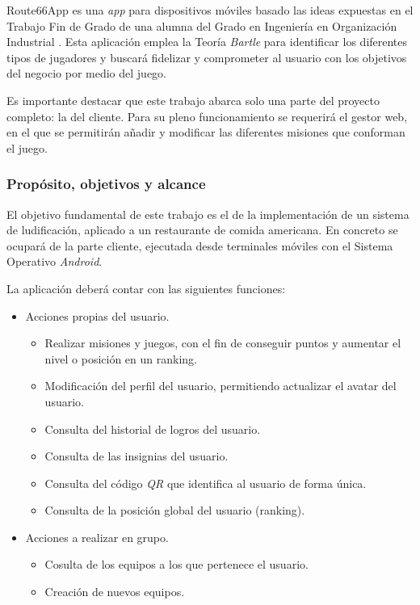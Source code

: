 \documentclass[twoside]{report}
\begin{document}
Route66App es una \textit{app} para dispositivos móviles basado las ideas expuestas en el Trabajo Fin de Grado de una alumna del Grado en Ingeniería en Organización Industrial \cite{cristinatfg}. Esta aplicación emplea la Teoría \textit{Bartle}\cite{iebsctj} para identificar los diferentes tipos de jugadores y buscará fidelizar y comprometer al usuario con los objetivos del negocio por medio del juego.

Es importante destacar que este trabajo abarca solo una parte del proyecto completo: la del cliente. Para su pleno funcionamiento se requerirá el gestor web, en el que se permitirán añadir y modificar las diferentes misiones que conforman el juego. 
 
\subsubsection{Propósito, objetivos y alcance}

El objetivo fundamental de  este trabajo es el de la implementación de un sistema de ludificación, aplicado a un restaurante de comida americana. En concreto se ocupará de la parte cliente, ejecutada desde terminales móviles con el Sistema Operativo \textit{Android}.

La aplicación deberá contar con las siguientes funciones:
\begin{itemize}
\item Acciones propias del usuario.
	\begin{itemize}
	\item Realizar misiones y juegos, con el fin de conseguir puntos y aumentar el nivel o posición en un ranking.
	\item Modificación del perfil del usuario, permitiendo actualizar el avatar del usuario.
	\item Consulta del historial de logros del usuario.
	\item Consulta de las insignias del usuario.
	\item Consulta del código \textit{QR} que identifica al usuario de forma única.
	\item Consulta de la posición global del usuario (ranking).
	\end{itemize}
	\end{itemize}
\begin{itemize}
\item Acciones a realizar en grupo.
	\begin{itemize}
	\item Cosulta de los equipos a los que pertenece el usuario.
	\item Creación de nuevos equipos.
	\end{itemize}
\end{itemize}
\end{document}
